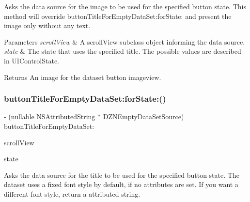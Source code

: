 Asks the data source for the image to be used for the specified button state. This method will override button\+Title\+For\+Empty\+Data\+Set\+:for\+State\+: and present the image only without any text.


\begin{DoxyParams}{Parameters}
{\em scroll\+View} & A scroll\+View subclass object informing the data source. \\
\hline
{\em state} & The state that uses the specified title. The possible values are described in U\+I\+Control\+State. \\
\hline
\end{DoxyParams}
\begin{DoxyReturn}{Returns}
An image for the dataset button imageview. 
\end{DoxyReturn}
\mbox{\label{protocol_d_z_n_empty_data_set_source_01-p_ac7afc4579b4c917f060e87effd5485ee}} 
\subsubsection{\texorpdfstring{button\+Title\+For\+Empty\+Data\+Set\+:for\+State\+:()}{buttonTitleForEmptyDataSet:forState:()}}
{\footnotesize\ttfamily -\/ (nullable N\+S\+Attributed\+String $\ast$ D\+Z\+N\+Empty\+Data\+Set\+Source) button\+Title\+For\+Empty\+Data\+Set\+: \begin{DoxyParamCaption}\item[{(U\+I\+Scroll\+View $\ast$)}]{scroll\+View }\item[{forState:(U\+I\+Control\+State)}]{state }\end{DoxyParamCaption}\hspace{0.3cm}{\ttfamily [optional]}}

Asks the data source for the title to be used for the specified button state. The dataset uses a fixed font style by default, if no attributes are set. If you want a different font style, return a attributed string.


